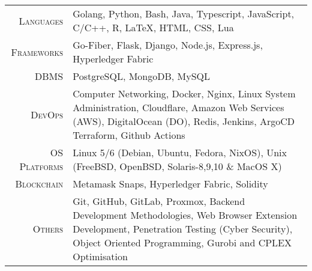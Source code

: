 \documentclass[a4paper,10pt]{extarticle} %
\begin{document}
 \begin{tabular}{r|p{15cm}}
 \textsc{Languages} & Golang, Python, Bash, Java, Typescript, JavaScript, C/C++, R, LaTeX, HTML, CSS, Lua\\
 \textsc{Frameworks} & Go-Fiber, Flask, Django, Node.js, Express.js, Hyperledger Fabric \\
 \textsc{DBMS} & PostgreSQL, MongoDB, MySQL \\
 \textsc{DevOps} & Computer Networking, Docker, Nginx, Linux System Administration, Cloudflare, Amazon Web Services (AWS), DigitalOcean (DO), Redis, Jenkins, ArgoCD Terraform, Github Actions \\
 \textsc{OS Platforms} & Linux 5/6 (Debian, Ubuntu, Fedora, NixOS), Unix (FreeBSD, OpenBSD, Solaris-8,9,10 \& MacOS X) \\
 \textsc{Blockchain} & Metamask Snaps, Hyperledger Fabric, Solidity \\
 \textsc{Others} & Git, GitHub, GitLab, Proxmox, Backend Development Methodologies, Web Browser Extension Development, Penetration Testing (Cyber Security), Object Oriented Programming, Gurobi and CPLEX Optimisation \\
 
 
\end{tabular}



\end{document}
